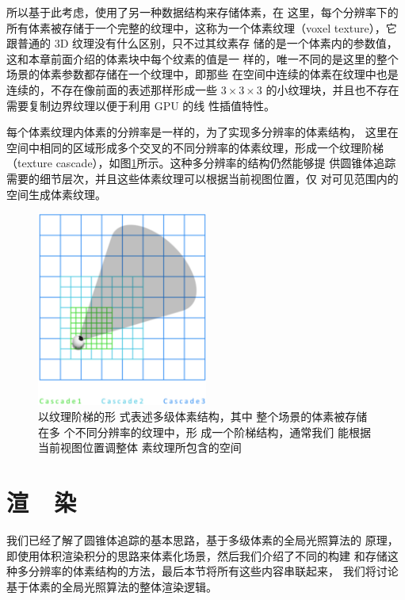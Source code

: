 所以基于此考虑，\cite{a:TheTechnologyofTheTomorrowChildren}使用了另一种数据结构来存储体素，在 这里，每个分辨率下的所有体素被存储于一个完整的纹理中，这称为一个体素纹理（voxel texture），它跟普通的 3D 纹理没有什么区别，只不过其纹素存 储的是一个体素内的参数值，这和本章前面介绍的体素块中每个纹素的值是一 样的，唯一不同的是这里的整个场景的体素参数都存储在一个纹理中，即那些 在空间中连续的体素在纹理中也是连续的，不存在像前面的表述那样形成一些 $3\times  3\times  3$ 的小纹理块，并且也不存在需要复制边界纹理以便于利用 GPU 的线 性插值特性。

每个体素纹理内体素的分辨率是一样的，为了实现多分辨率的体素结构， 这里在空间中相同的区域形成多个交叉的不同分辨率的体素纹理，形成一个纹理阶梯（texture cascade），如图\ref{f:vct-texture-cascaded}所示。这种多分辨率的结构仍然能够提 供圆锥体追踪需要的细节层次，并且这些体素纹理可以根据当前视图位置，仅 对可见范围内的空间生成体素纹理。

\begin{figure}
	\sidecaption
	\includegraphics[width=0.5\textwidth]{figures/vct/texture-cascaded}
	\caption{以纹理阶梯的形 式表述多级体素结构，其中 整个场景的体素被存储在多 个不同分辨率的纹理中，形 成一个阶梯结构，通常我们 能根据当前视图位置调整体 素纹理所包含的空间}
	\label{f:vct-texture-cascaded}
\end{figure}




\section{渲~~染}\label{sec:vct-rendering}
我们已经了解了圆锥体追踪的基本思路，基于多级体素的全局光照算法的 原理，即使用体积渲染积分的思路来体素化场景，然后我们介绍了不同的构建 和存储这种多分辨率的体素结构的方法，最后本节将所有这些内容串联起来， 我们将讨论基于体素的全局光照算法的整体渲染逻辑。

